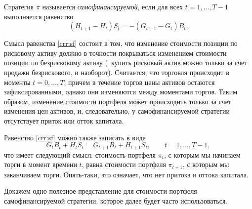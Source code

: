 \begin{definition}
Стратегия $\pi$ называется \emph{самофинансируемой}, если для всех $t=1,\dots,T-1$ выполняется равенство
\begin{equation}
\label{crr:sf}
(H_{t+1} - H_t)S_t = -(G_{t+1} - G_t)B_t.
\end{equation}
\end{definition}
Смысл равенства \eqref{crr:sf} состоит в том, что изменение стоимости позиции по рисковому активу должно в точности покрываться изменением стоимости позиции по безрисковому активу (\te\ купить рисковый актив можно только за счет продажи безрискового, и наоборот). 
Считается, что торговля происходит в моменты $t=0,\dots,T$, причем в течение торгов цены активов остаются зафиксированными, однако они изменяются между моментами торгов. Таким образом, изменение стоимости портфеля может происходить только за счет изменения цен активов, и, следовательно, у самофинансируемой стратегии отсутствует приток или отток капитала.

\begin{remark}
Равенство \eqref{crr:sf} можно также записать в виде
\[
G_tB_t + H_tS_t = G_{t+1}B_t + H_{t+1}S_t, \qquad t=1,\dots,T-1,
\]
что имеет следующий смысл: стоимость портфеля $\pi_t$, с которым мы начинаем торги в момент времени $t$, равна стоимости портфеля $\pi_{t+1}$, с которым мы заканчиваем торги.
Опять-таки, это означает, что нет притока и оттока капитала.
\end{remark}


Докажем одно полезное представление для стоимости портфеля самофинансируемой стратегии, которое далее будет часто использоваться.

